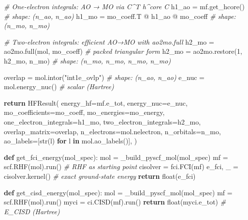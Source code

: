 \documentclass[
  11pt,
]{report}
\newenvironment{Shaded}{}{}
\newcommand{\BuiltInTok}[1]{\textcolor[rgb]{0.00,0.50,0.00}{#1}}
\newcommand{\CommentTok}[1]{\textcolor[rgb]{0.38,0.63,0.69}{\textit{#1}}}
\newcommand{\ControlFlowTok}[1]{\textcolor[rgb]{0.00,0.44,0.13}{\textbf{#1}}}
\newcommand{\DecValTok}[1]{\textcolor[rgb]{0.25,0.63,0.44}{#1}}
\newcommand{\KeywordTok}[1]{\textcolor[rgb]{0.00,0.44,0.13}{\textbf{#1}}}
\newcommand{\NormalTok}[1]{#1}
\newcommand{\OperatorTok}[1]{\textcolor[rgb]{0.40,0.40,0.40}{#1}}
\newcommand{\StringTok}[1]{\textcolor[rgb]{0.25,0.44,0.63}{#1}}
\begin{document}
\begin{Shaded}
\begin{Highlighting}[]
    \CommentTok{\# One{-}electron integrals: AO → MO via C\^{}T h\^{}core C}
\NormalTok{    h1\_ao }\OperatorTok{=}\NormalTok{ mf.get\_hcore()                  }\CommentTok{\# shape: (n\_ao, n\_ao)}
\NormalTok{    h1\_mo }\OperatorTok{=}\NormalTok{ mo\_coeff.T }\OperatorTok{@}\NormalTok{ h1\_ao }\OperatorTok{@}\NormalTok{ mo\_coeff   }\CommentTok{\# shape: (n\_mo, n\_mo)}

    \CommentTok{\# Two{-}electron integrals: efficient AO→MO with ao2mo.full}
\NormalTok{    h2\_mo }\OperatorTok{=}\NormalTok{ ao2mo.full(mol, mo\_coeff)       }\CommentTok{\# packed triangular form}
\NormalTok{    h2\_mo }\OperatorTok{=}\NormalTok{ ao2mo.restore(}\DecValTok{1}\NormalTok{, h2\_mo, n\_mo)   }\CommentTok{\# shape: (n\_mo, n\_mo, n\_mo, n\_mo)}

\NormalTok{    overlap }\OperatorTok{=}\NormalTok{ mol.intor(}\StringTok{"int1e\_ovlp"}\NormalTok{)       }\CommentTok{\# shape: (n\_ao, n\_ao)}
\NormalTok{    e\_nuc }\OperatorTok{=}\NormalTok{ mol.energy\_nuc()                }\CommentTok{\# scalar (Hartree)}

    \ControlFlowTok{return}\NormalTok{ HFResult(}
\NormalTok{        energy\_hf}\OperatorTok{=}\NormalTok{mf.e\_tot, energy\_nuc}\OperatorTok{=}\NormalTok{e\_nuc,}
\NormalTok{        mo\_coefficients}\OperatorTok{=}\NormalTok{mo\_coeff, mo\_energies}\OperatorTok{=}\NormalTok{mo\_energy,}
\NormalTok{        one\_electron\_integrals}\OperatorTok{=}\NormalTok{h1\_mo, two\_electron\_integrals}\OperatorTok{=}\NormalTok{h2\_mo,}
\NormalTok{        overlap\_matrix}\OperatorTok{=}\NormalTok{overlap,}
\NormalTok{        n\_electrons}\OperatorTok{=}\NormalTok{mol.nelectron, n\_orbitals}\OperatorTok{=}\NormalTok{n\_mo,}
\NormalTok{        ao\_labels}\OperatorTok{=}\NormalTok{[}\BuiltInTok{str}\NormalTok{(l) }\ControlFlowTok{for}\NormalTok{ l }\KeywordTok{in}\NormalTok{ mol.ao\_labels()],}
\NormalTok{    )}


\KeywordTok{def}\NormalTok{ get\_fci\_energy(mol\_spec):}
\NormalTok{    mol }\OperatorTok{=}\NormalTok{ \_build\_pyscf\_mol(mol\_spec)}
\NormalTok{    mf }\OperatorTok{=}\NormalTok{ scf.RHF(mol).run()       }\CommentTok{\# RHF as starting point}
\NormalTok{    cisolver }\OperatorTok{=}\NormalTok{ fci.FCI(mf)}
\NormalTok{    e\_fci, \_ }\OperatorTok{=}\NormalTok{ cisolver.kernel()   }\CommentTok{\# exact ground{-}state energy}
    \ControlFlowTok{return} \BuiltInTok{float}\NormalTok{(e\_fci)}


\KeywordTok{def}\NormalTok{ get\_cisd\_energy(mol\_spec):}
\NormalTok{    mol }\OperatorTok{=}\NormalTok{ \_build\_pyscf\_mol(mol\_spec)}
\NormalTok{    mf }\OperatorTok{=}\NormalTok{ scf.RHF(mol).run()}
\NormalTok{    myci }\OperatorTok{=}\NormalTok{ ci.CISD(mf).run()}
    \ControlFlowTok{return} \BuiltInTok{float}\NormalTok{(myci.e\_tot)       }\CommentTok{\# E\_CISD (Hartree)}



\end{Highlighting}
\end{Shaded}
\end{document}
